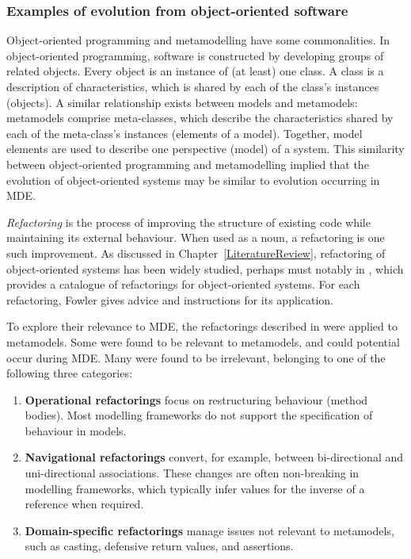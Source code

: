 \subsubsection{Examples of evolution from object-oriented software}
Object-oriented programming and metamodelling have some commonalities. In object-oriented programming, software is constructed by developing groups of related objects. Every object is an instance of (at least) one class. A class is a description of characteristics, which is shared by each of the class's instances (objects). A similar relationship exists between models and metamodels: metamodels comprise meta-classes, which describe the characteristics shared by each of the meta-class's instances (elements of a model). Together, model elements are used to describe one perspective (model) of a system. This similarity between object-oriented programming and metamodelling implied that the evolution of object-oriented systems may be similar to evolution occurring in MDE. 

\emph{Refactoring} is the process of improving the structure of existing code while maintaining its external behaviour. When used as a noun, a refactoring is one such improvement. As discussed in Chapter~\ref{LiteratureReview}, refactoring of object-oriented systems has been widely studied, perhaps must notably in \cite{fowler99refactoring}, which provides a catalogue of refactorings for object-oriented systems. For each refactoring, Fowler gives advice and instructions for its application.

To explore their relevance to MDE, the refactorings described in \cite{fowler99refactoring} were applied to metamodels. Some were found to be relevant to metamodels, and could potential occur during MDE. Many were found to be irrelevant, belonging to one of the following three categories:

\begin{enumerate}
	\item \textbf{Operational refactorings} focus on restructuring behaviour (method bodies). Most modelling frameworks do not support the specification of behaviour in models.
	\item \textbf{Navigational refactorings} convert, for example, between bi-directional and uni-directional associations. These changes are often non-breaking in modelling frameworks, which typically infer values for the inverse of a reference when required.
	\item \textbf{Domain-specific refactorings} manage issues not relevant to metamodels, such as casting, defensive return values, and assertions.
\end{enumerate}


